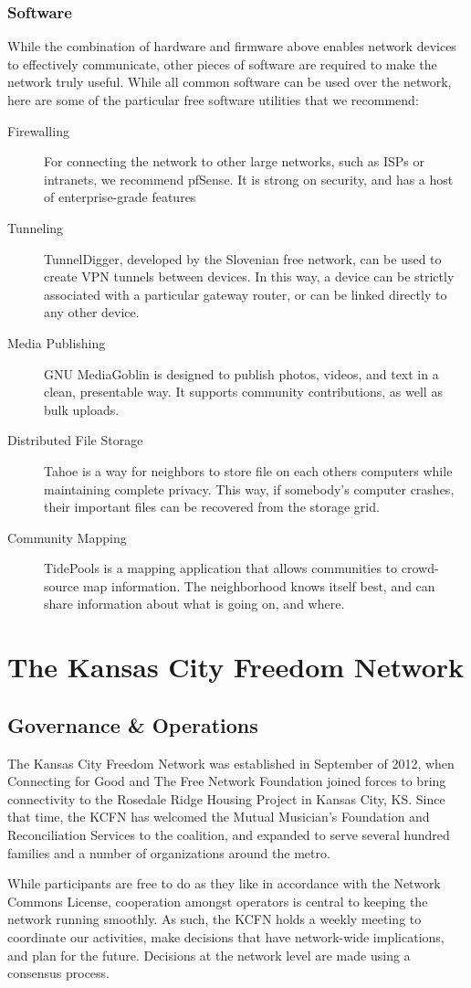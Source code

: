 \subsubsection{Software}
While the combination of hardware and firmware above enables network devices to
effectively communicate, other pieces of software are required to make the
network truly useful. While all common software can be used over the
network, here are some of the particular free software utilities that we recommend:
\begin{description}
\item[Firewalling] For connecting the network to other large networks, such as ISPs
or intranets, we recommend pfSense. It is strong on security, and has a host of
enterprise-grade features
\item[Tunneling] TunnelDigger, developed by the Slovenian free network, can be
used to create VPN tunnels between devices. In this way, a device can be
strictly associated with a particular gateway router, or can be linked directly
to any other device.
\item[Media Publishing] GNU MediaGoblin is designed to publish photos, videos, and
text in a clean, presentable way. It supports community contributions, as well as
bulk uploads.
\item[Distributed File Storage] Tahoe is a way for neighbors to store file on
 each others computers while maintaining complete privacy. This way, if
somebody's computer crashes, their important files can be recovered from the
storage grid.
\item[Community Mapping] TidePools is a mapping application that allows
communities to crowd-source map information. The neighborhood knows itself best,
and can share information about what is going on, and where.
\end{description} 


\section{The Kansas City Freedom Network}\label{KCFN}
\subsection{Governance \& Operations}
The Kansas City Freedom Network was established in September of 2012, when
Connecting for Good and The Free Network Foundation joined forces to bring
connectivity to the Rosedale Ridge Housing Project in Kansas City, KS. Since
that time, the KCFN has welcomed the Mutual Musician's Foundation and
Reconciliation Services to the coalition, and expanded to serve several hundred 
families and a number of organizations around the metro. \par
While participants are free to do
as they like in accordance with the Network Commons License,
cooperation amongst operators is central to keeping the network running smoothly. As such, the 
KCFN holds a weekly meeting to coordinate our activities, make decisions
that have network-wide implications, and plan for the future. Decisions at the
network level are made using a consensus process. \par 

